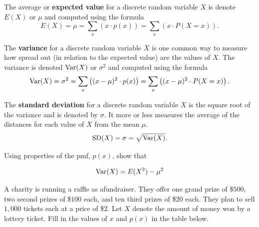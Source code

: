 \clearpage


\begin{tcolorbox}
\begin{definition}\label{def:expected}
The average or \textbf{\alert{expected value}} for a discrete random variable $X$ is denote $E(X)$ or $\mu$ and computed using the formula
\[ E(X) = \mu =  \sum_x \left( x \cdot p(x) \right) = \sum_x \left( x \cdot P(X=x) \right). \]
\end{definition}
\vspace{-0.5in}

\begin{definition}\label{def:variance}
The \textbf{\alert{variance}} for a discrete random variable $X$ is one common way to measure how spread out (in relation to the expected value) are the values of $X$. The variance is denoted $\mbox{Var}(X)$ or $\sigma^2$ and computed using the formula
\[ \mbox{Var}(X) = \sigma^2 =  \sum_x \left( (x-\mu)^2 \cdot p(x) \right) = \sum_x \left( (x-\mu)^2 \cdot P(X=x) \right). \]
\end{definition}
\vspace{-0.5in}

\begin{definition}\label{def:variance}
The \textbf{\alert{standard deviation}} for a discrete random variable $X$ is the square root of the variance and is denoted by $\sigma$. It more or less measures the average of the distances for each value of $X$ from the mean $\mu$.
\[ \mbox{SD}(X) = \sigma =  \sqrt{\mbox{Var}(X)}. \]
\end{definition}


\end{tcolorbox}

\bb[resume]
\ii Using properties of the pmf, $p(x)$, show that \label{var-prop}
\begin{tcolorbox}
\[ \mbox{Var}(X) = E(X^2)  - \mu^2  \]
\end{tcolorbox}

\vspace{0.5in}
\vfill

\ii A charity is running a raffle as afundraiser. They offer one grand prize of \$$500$, two second prizes of \$$100$ each, and ten third prizes of \$$20$ each. They plan to sell $1,\!000$ tickets each at a price of \$$2$. Let $X$ denote the amount of money won by a lottery ticket.\label{lottery}
\bb
\ii Fill in the values of $x$ and $p(x)$ in the table below.\medskip

